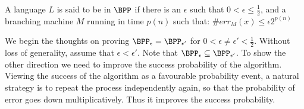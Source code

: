 \begin{definition}[BPP]
A language $L$ is said to be in $\BPP$ if there is an $\epsilon$ such
that $0 < \epsilon \le \frac{1}{2}$, and a branching machine $M$
running in time $p(n)$ such that: $\#err_M(x) \le \epsilon2^{p(n)}$
\end{definition}

We begin the thoughts on proving $\BPP_\epsilon = \BPP_{\epsilon'}$
for $0 < \epsilon \ne \epsilon' < \frac{1}{2}$. Without loss of
generality, assume that $\epsilon < \epsilon'$.  Note that
$\BPP_\epsilon \subseteq \BPP_{\epsilon'}$. To show the other
direction we need to improve the success probability of the
algorithm. Viewing the success of the algorithm as a favourable
probability event, a natural strategy is to repeat the process
independently again, so that the probability of error goes down
multiplicatively. Thus it improves the success probability.


